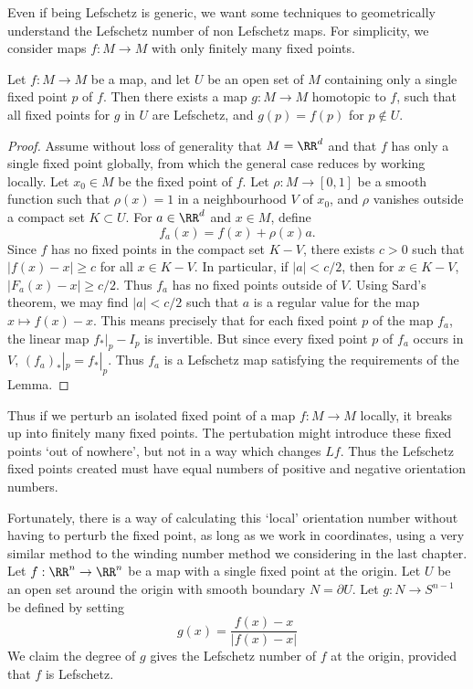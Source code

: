 Even if being Lefschetz is generic, we want some techniques to geometrically understand the Lefschetz number of non Lefschetz maps. For simplicity, we consider maps $f: M \to M$ with only finitely many fixed points.

\begin{theorem}
    Let $f: M \to M$ be a map, and let $U$ be an open set of $M$ containing only a single fixed point $p$ of $f$. Then there exists a map $g: M \to M$ homotopic to $f$, such that all fixed points for $g$ in $U$ are Lefschetz, and $g(p) = f(p)$ for $p \not \in U$.
\end{theorem}
\begin{proof}
    Assume without loss of generality that $M = \RR^d$ and that $f$ has only a single fixed point globally, from which the general case reduces by working locally. Let $x_0 \in M$ be the fixed point of $f$. Let $\rho: M \to [0,1]$ be a smooth function such that $\rho(x) = 1$ in a neighbourhood $V$ of $x_0$, and $\rho$ vanishes outside a compact set $K \subset U$. For $a \in \RR^d$ and $x \in M$, define
    \[ f_a(x) = f(x) + \rho(x) a. \]
    Since $f$ has no fixed points in the compact set $K - V$, there exists $c > 0$ such that $|f(x) - x| \geq c$ for all $x \in K - V$. In particular, if $|a| < c/2$, then for $x \in K - V$, $|F_a(x) - x| \geq c/2$. Thus $f_a$ has no fixed points outside of $V$. Using Sard's theorem, we may find $|a| < c/2$ such that $a$ is a regular value for the map $x \mapsto f(x) - x$. This means precisely that for each fixed point $p$ of the map $f_a$, the linear map $f_*|_p - I_p$ is invertible. But since every fixed point $p$ of $f_a$ occurs in $V$, $(f_a)_*|_p = f_*|_p$. Thus $f_a$ is a Lefschetz map satisfying the requirements of the Lemma.
\end{proof}

Thus if we perturb an isolated fixed point of a map $f: M \to M$ locally, it breaks up into finitely many fixed points. The pertubation might introduce these fixed points `out of nowhere', but not in a way which changes $Lf$. Thus the Lefschetz fixed points created must have equal numbers of positive and negative orientation numbers.

Fortunately, there is a way of calculating this `local' orientation number without having to perturb the fixed point, as long as we work in coordinates, using a very similar method to the winding number method we considering in the last chapter. Let $f: \RR^n \to \RR^n$ be a map with a single fixed point at the origin. Let $U$ be an open set around the origin with smooth boundary $N = \partial U$. Let $g: N \to S^{n-1}$ be defined by setting
%
\[ g(x) = \frac{f(x) - x}{|f(x) - x|} \]
%
We claim the degree of $g$ gives the Lefschetz number of $f$ at the origin, provided that $f$ is Lefschetz.

